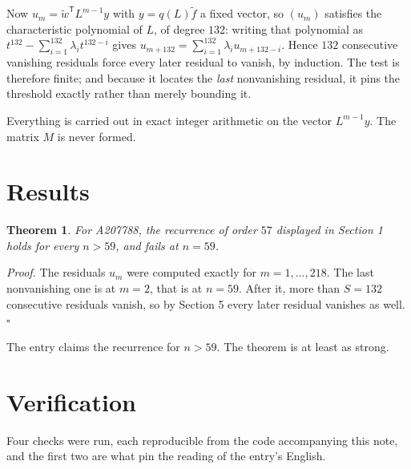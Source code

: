 \documentclass[11pt]{article}
\newtheorem{theorem}{Theorem}
\theoremstyle{definition}
\begin{document}
Now $u_m = \tilde w^{\mathsf T} L^{m-1} y$ with $y = q(L)\tilde f$ a fixed vector, so $(u_m)$ satisfies the characteristic polynomial of $L$, of degree $132$: writing that polynomial as $t^{132} - \sum_{i=1}^{132} \lambda_i t^{132-i}$ gives $u_{m+132} = \sum_{i=1}^{132} \lambda_i u_{m+132-i}$. Hence $132$ consecutive vanishing residuals force every later residual to vanish, by induction. The test is therefore finite; and because it locates the {\itshape last} nonvanishing residual, it pins the threshold exactly rather than merely bounding it.

Everything is carried out in exact integer arithmetic on the vector $L^{m-1}y$. The matrix $M$ is never formed.

\section{Results}

\begin{theorem} For A207788, the recurrence of order $57$ displayed in Section 1 holds for every $n > 59$, and fails at $n = 59$.\end{theorem}

{\itshape Proof.} The residuals $u_m$ were computed exactly for $m = 1,\dots,218$. The last nonvanishing one is at $m = 2$, that is at $n = 59$. After it, more than $S = 132$ consecutive residuals vanish, so by Section 5 every later residual vanishes as well. $\square$

The entry claims the recurrence for $n > 59$. The theorem is at least as strong.

\section{Verification}

Four checks were run, each reproducible from the code accompanying this note, and the first two are what pin the reading of the entry's English.
\end{document}
